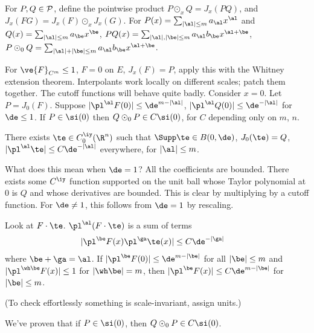 For $P,Q\in \cal P$, define the pointwise product $P\odot_x Q= J_x(PQ)$, and $J_x(FG) = J_x(F)\odot_x J_x(G)$. For $P(x) = \sum_{|\al|\le m} a_\al x^\al$ and $Q(x) = \sum_{|\al|\le m} a_\be x^\be$, $PQ(x) = \sum_{|\al|,|\be|\le m} a_\al b_\be x^{\al+\be}$, $P\odot_0 Q = \sum_{|\al|+|\be|\le m} a_\al b_\be x^{\al+\be}$. 

For $\ve{F}_{C^m}\le 1$, $F=0$ on $E$, $J_x(F)=P$, %
apply this with the Whitney extension theorem. Interpolants work locally on different scales; patch them together. The cutoff functions will behave quite badly. 
Consider $x=0$. 
Let $P=J_0(F)$. Suppose %
$|\pl^\al F(0)|\le \de^{m-|\al|}$, $|\pl^\al Q(0)|\le \de^{-|\al|}$
for $\de\le 1$. If $P\in \si(0)$ then $Q\odot_0 P \in C\si(0)$, for $C$ depending only on $m$, $n$. 

There exists $\te\in C_0^\iy(\R^n)$ such that $\Supp\te\in B(0,\de)$, $J_0(\te)=Q$, $|\pl^\al \te|\le C\de^{-|\al|}$ everywhere, for $|\al|\le m$. 

What does this mean when $\de=1$? All the coefficients are bounded. There exists some $C^\iy$ function supported on the unit ball whose Taylor polynomial at 0 is $Q$ and whose derivatives are bounded. This is clear by multiplying by a cutoff function. For $\de\ne 1$, this follows from $\de=1$ by rescaling. 

Look at $F\cdot \te$. $\pl^\al(F\cdot \te)$ is a sum of terms
\begin{align}
|\pl^\be F(x) \pl^\ga \te(x) |
&\le C\de^{-|\ga|}
\end{align}
where $\be+\ga=\al$. %
If $|\pl^\be F(0)|\le \de^{m-|\be|}$ for all $|\be|\le m$ and $|\pl^{\wh\be} F(x)|\le 1$  for $|\wh \be |=m$, then $|\pl^\be F(x)|\le C\de^{m-|\be|}$ for $|\be|\le m$. 


(To  check effortlessly something is scale-invariant, assign units.)

We've proven that if $P\in \si(0)$, then $Q\odot_0P \in C\si(0)$.


